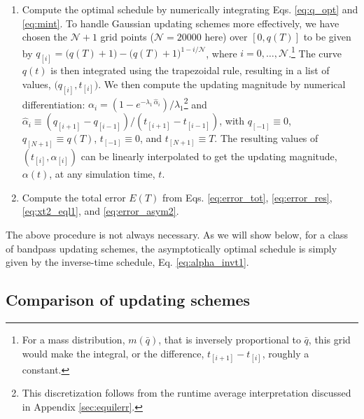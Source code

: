\documentclass[preprint, superscriptaddress, floatfix]{revtex4-1}
\newcommand{\Err}{E}
\begin{document}
\begin{enumerate}
\item \label{step:alpha}
Compute the optimal schedule by
  numerically integrating Eqs. \eqref{eq:q_opt} and \eqref{eq:mint}.
%
To handle Gaussian updating schemes more effectively,
  we have chosen the $\mathcal N+1$ grid points
  ($\mathcal N=20000$ here)
  over $[0, q(T)]$ to be given by
  $q_{[i]} = \bigl(q(T) + 1\bigr) - \bigl(q(T)+1\bigr)^{1-i/\mathcal N}$,
  where $i = 0, \dots, \mathcal N$.\footnote{For
    a mass distribution, $m(\bar q)$, that is
    inversely proportional to $\bar q$,
    this grid would make the integral,
    or the difference, $t_{[i+1]} - t_{[i]}$,
    roughly a constant.}
%
The curve $q(t)$ is then integrated
  using the trapezoidal rule\cite{press3rd},
  resulting in a list of values, $\bigl(q_{[i]}, t_{[i]} \bigr)$.
%
We then compute the updating magnitude by numerical differentiation:
  $\alpha_i = (1 - e^{-\lambda_1 \, \hat \alpha_i})/\lambda_1$\footnote{This
    discretization follows from the runtime average interpretation
    discussed in Appendix \ref{sec:equilerr}.}
  and
  $\hat \alpha_i \equiv (q_{[i+1]} - q_{[i-1]}) / (t_{[i+1]} - t_{[i-1]})$,
  with
  $q_{[ -1]} \equiv 0$,
  $q_{[N+1]} \equiv q(T)$,
  $t_{[ -1]} \equiv 0$, and
  $t_{[N+1]} \equiv T$.
%
The resulting values of $(t_{[i]}, \alpha_{[i]})$
  can be linearly interpolated
  to get the updating magnitude, $\alpha(t)$, at any simulation time, $t$.


\item
  Compute the total error $\Err(T)$ from
Eqs. \eqref{eq:error_tot},
  \eqref{eq:error_res},
  \eqref{eq:xt2_eql1},
  and
  \eqref{eq:error_asym2}.

\end{enumerate}

The above procedure is not always necessary.
%
As we will show below, for a class of bandpass updating schemes,
  the asymptotically optimal schedule
  is simply given by the inverse-time schedule, Eq. \eqref{eq:alpha_invt1}.
%



\subsection{\label{sec:cmpschemes}
Comparison of updating schemes}
\end{document}

